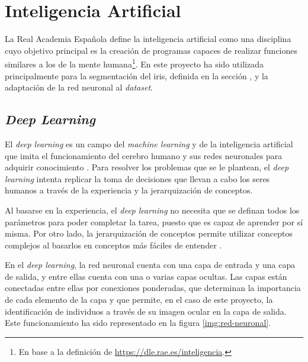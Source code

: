 \section{Inteligencia Artificial}

La Real Academia Española define la inteligencia artificial como una disciplina cuyo objetivo principal es la creación de programas capaces de realizar funciones similares a los de la mente humana\footnote{En base a la definición de \url{https://dle.rae.es/inteligencia}.}. 
En este proyecto ha sido utilizada principalmente para la segmentación del iris, definida en la sección , y la adaptación de la red neuronal al \textit{dataset}.

\subsection{\textit{Deep Learning}}

El \textit{deep learning} es un campo del \textit{machine learning} y de la inteligencia artificial que imita el funcionamiento del cerebro humano y sus redes neuronales para adquirir conocimiento \cite{Goodfellow-et-al-2016}. 
Para resolver los problemas que se le plantean, el \textit{deep learning} intenta replicar la toma de decisiones que llevan a cabo los seres humanos a través de la experiencia y la jerarquización de conceptos. 

Al basarse en la experiencia, el \textit{deep learning} no necesita que se definan todos los parámetros para poder completar la tarea, puesto que es capaz de aprender por sí misma. Por otro lado, la jerarquización de conceptos permite utilizar conceptos complejos 
al basarlos en conceptos más fáciles de entender \cite{Goodfellow-et-al-2016}.

En el \textit{deep learning}, la red neuronal cuenta con una capa de entrada y una capa de salida, y entre ellas cuenta con una o varias capas ocultas. 
Las capas están conectadas entre ellas por conexiones ponderadas, que determinan la importancia de cada elemento de la capa y que permite, en el caso de este proyecto, la identificación de individuos a través de su imagen ocular en la capa de salida. Este funcionamiento ha sido representado en la figura \ref{img:red-neuronal}.


